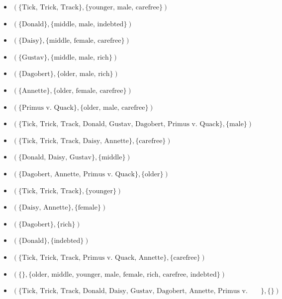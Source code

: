 \documentclass{article}
\begin{document}
\begin{itemize}
    \item $(\{\text{Tick, Trick, Track}\}, \{\text{younger, male, carefree}\})$
    \item $(\{\text{Donald}\}, \{\text{middle, male, indebted}\})$
    \item $(\{\text{Daisy}\}, \{\text{middle, female, carefree}\})$
    \item $(\{\text{Gustav}\}, \{\text{middle, male, rich}\})$
    \item $(\{\text{Dagobert}\}, \{\text{older, male, rich}\})$
    \item $(\{\text{Annette}\}, \{\text{older, female, carefree}\})$
    \item $(\{\text{Primus v. Quack}\}, \{\text{older, male, carefree}\})$
    \item $(\{\text{Tick, Trick, Track, Donald, Gustav, Dagobert, Primus v. Quack}\}, \{\text{male}\})$
    \item $(\{\text{Tick, Trick, Track, Daisy, Annette}\}, \{\text{carefree}\})$
    \item $(\{\text{Donald, Daisy, Gustav}\}, \{\text{middle}\})$
    \item $(\{\text{Dagobert, Annette, Primus v. Quack}\}, \{\text{older}\})$
    \item $(\{\text{Tick, Trick, Track}\}, \{\text{younger}\})$
    \item $(\{\text{Daisy, Annette}\}, \{\text{female}\})$
    \item $(\{\text{Dagobert}\}, \{\text{rich}\})$
    \item $(\{\text{Donald}\}, \{\text{indebted}\})$
    \item $(\{\text{Tick, Trick, Track, Primus v. Quack, Annette}\}, \{\text{carefree}\})$
    \item $(\{\},\{\text{older, middle, younger, male, female, rich, carefree, indebted}\})$
    \item $(\{\text{Tick, Trick, Track, Donald, Daisy, Gustav, Dagobert, Annette, Primus v. Quack}\}, \{\})$
\end{itemize}
\end{document}
